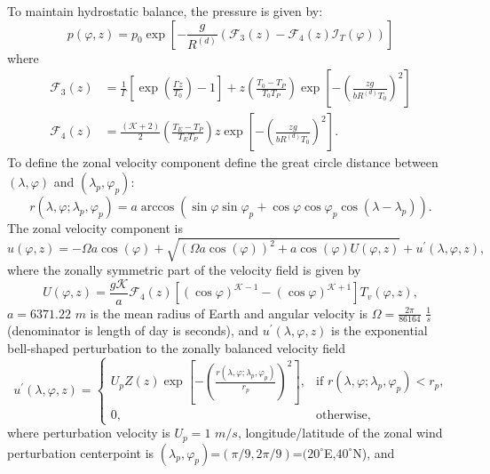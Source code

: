 \documentclass{agujournal}
\begin{document}
{To maintain hydrostatic balance, the pressure is given by:
\begin{equation}
p(\varphi, z) = p_0\exp \left[ -\frac{g}{R^{(d)}}(\mathcal{F}_{3}(z) -\mathcal{F}_{4}(z) \mathcal{I}_T(\varphi) ) \right]\label{eq:baroPmoist}
\end{equation} where
\begin{align}
\mathcal{F}_{3}(z) &=\frac{1}{\Gamma} \left[ \exp\left( \frac{\Gamma z}{T_0} \right)-1 \right] + z \left(\frac{T_0-T_P}{T_0T_P} \right) \exp\left[-\left(\frac{z g}{b R^{(d)} T_0}\right)^2\right] \\
\mathcal{F}_{4}(z) &=\frac{({\mathcal{K}}+2)}{2} \left(\frac{T_E-T_P}{T_E T_P} \right) z \exp\left[-\left(\frac{z g}{b R^{(d)} T_0}\right)^2\right].
\end{align}    
To define the zonal velocity component define the great circle distance between $(\lambda,\varphi)$ and $(\lambda_p,\varphi_p)$:
\begin{equation}
r(\lambda, \varphi; \lambda_p, \varphi_p) = a \arccos \left( \sin \varphi \sin \varphi_p + \cos \varphi \cos \varphi_p \cos (\lambda - \lambda_p) \right).
\end{equation}
The zonal velocity component is
\begin{equation}
u(\varphi, z) = -\Omega a \cos(\varphi)+\sqrt{(\Omega a\cos(\varphi))^2+ a\cos(\varphi)U(\varphi,z)}+u^\prime(\lambda, \varphi, z),
\end{equation} where the zonally symmetric part of the velocity field is given by
\begin{equation}
U(\varphi,z) = \frac{g {\mathcal{K}}}{a} \mathcal{F}_{4}(z) \left[ (\cos \varphi)^{{\mathcal{K}} - 1} - (\cos \varphi)^{{\mathcal{K}} + 1} \right] T_v(\varphi, z),
\end{equation} 
$a=6371.22$ $m$ is the mean radius of Earth and angular velocity is $\Omega=\frac{2\pi}{86164}$ $\frac{1}{s}$ (denominator is length of day is seconds), and $u^\prime(\lambda, \varphi, z)$ is the exponential bell-shaped perturbation to the zonally balanced velocity field
\begin{equation}
u^\prime(\lambda, \varphi, z) = \left\{ \begin{array}{ll} U_p Z(z)  \exp \left[ - \left( \frac{r(\lambda, \varphi; \lambda_p, \varphi_p)}{r_p} \right)^2 \right], & \mbox{if $r(\lambda, \varphi; \lambda_p, \varphi_p) < r_p$,} \\ 0, & \mbox{otherwise,} \end{array} \right.
\end{equation} where perturbation velocity is $U_p=1$ $m/s$, longitude/latitude of the zonal wind perturbation centerpoint is $(\lambda_p,\varphi_p)$=$(\pi/9,2\pi/9)$=$(20^{\circ}$E,$40^{\circ}$N),  and
}
\end{document}
